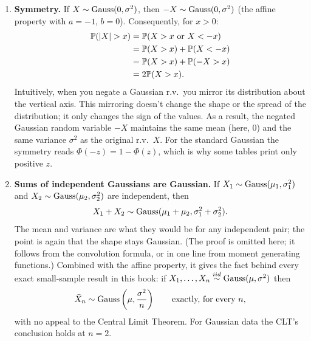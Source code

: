 \begin{enumerate}
\textbf{Question:} Why does this last result follow?

\textbf{Answer:} Consider $\Pr(u \leq X \leq v)$ where $X \sim \Gauss(\mu, \sigma^2)$.
First, mean-center the variables by subtracting the mean of $X$ in the inequalities and then divide each term by the standard deviation.
\begin{align*}
\Pr(u \leq X \leq v) &= \Pr(u - \mu \leq X - \mu \leq v - \mu) \\
					 &= \Pr \left( \frac{u - \mu}{\sigma} \leq \frac{X - \mu}{\sigma} \leq \frac{v - \mu}{\sigma} \right) \\
					 &= \Pr \left( \frac{u - \mu}{\sigma} \leq Z \leq \frac{v - \mu}{\sigma} \right).
\end{align*}
Observe that the inequalities are preserved because adding a number and multiplying by a positive number doesn't change an inequality's direction.

\item \textbf{Symmetry.}
If $X \sim \text{Gauss}(0, \sigma^2)$, then $-X \sim \text{Gauss}(0, \sigma^2)$ (the affine property with $a = -1$, $b = 0$).
Consequently, for $x > 0$:
\begin{align*}
\mathbb{P}(\lvert X\rvert > x) &= \mathbb{P}(X > x \text{ or } X < -x) \\
				&= \mathbb{P}(X > x) + \mathbb{P}(X < -x) \\
				&= \mathbb{P}(X > x) + \mathbb{P}(-X > x) \\
				&= 2 \mathbb{P}(X > x).
\end{align*}
Intuitively, when you negate a Gaussian r.v.\ you mirror its distribution about the vertical axis.
This mirroring doesn't change the shape or the spread of the distribution; it only changes the sign of the values.
As a result, the negated Gaussian random variable $-X$ maintains the same mean (here, 0) and the same variance $\sigma^2$ as the original r.v.\ $X$.
For the standard Gaussian the symmetry reads $\Phi(-z) = 1 - \Phi(z)$, which is why some tables print only positive $z$.

\item \textbf{Sums of independent Gaussians are Gaussian.}
If $X_1 \sim \text{Gauss}(\mu_1, \sigma_1^2)$ and $X_2 \sim \text{Gauss}(\mu_2, \sigma_2^2)$ are independent, then
\[
X_1 + X_2 \sim \text{Gauss}(\mu_1 + \mu_2, \sigma_1^2 + \sigma_2^2).
\]
The mean and variance are what they would be for any independent pair; the point is again that the shape stays Gaussian.
(The proof is omitted here; it follows from the convolution formula, or in one line from moment generating functions.)
Combined with the affine property, it gives the fact behind every exact small-sample result in this book: if $X_1, \ldots, X_n \stackrel{iid}{\sim} \text{Gauss}(\mu, \sigma^2)$ then
\[
\bar{X}_n \sim \text{Gauss} \left( \mu, \frac{\sigma^2}{n} \right) \qquad \text{exactly, for every } n,
\]
with no appeal to the Central Limit Theorem.
For Gaussian data the CLT's conclusion holds at $n = 2$.
\end{enumerate}

